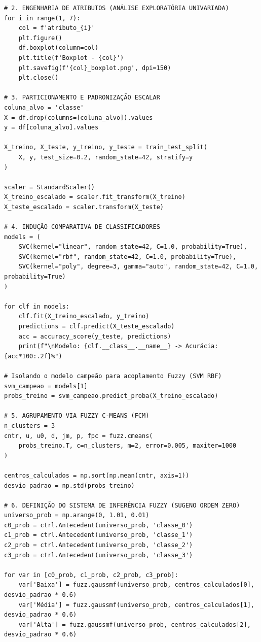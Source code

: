 \documentclass[journal]{IEEEtran}
\begin{document}
\begin{onecolumn}
\begin{verbatim}
# 2. ENGENHARIA DE ATRIBUTOS (ANÁLISE EXPLORATÓRIA UNIVARIADA)
for i in range(1, 7):
    col = f'atributo_{i}'
    plt.figure()
    df.boxplot(column=col)
    plt.title(f'Boxplot - {col}')
    plt.savefig(f'{col}_boxplot.png', dpi=150)
    plt.close()

# 3. PARTICIONAMENTO E PADRONIZAÇÃO ESCALAR
coluna_alvo = 'classe'
X = df.drop(columns=[coluna_alvo]).values
y = df[coluna_alvo].values

X_treino, X_teste, y_treino, y_teste = train_test_split(
    X, y, test_size=0.2, random_state=42, stratify=y
)

scaler = StandardScaler()
X_treino_escalado = scaler.fit_transform(X_treino)
X_teste_escalado = scaler.transform(X_teste)

# 4. INDUÇÃO COMPARATIVA DE CLASSIFICADORES
models = (
    SVC(kernel="linear", random_state=42, C=1.0, probability=True), 
    SVC(kernel="rbf", random_state=42, C=1.0, probability=True), 
    SVC(kernel="poly", degree=3, gamma="auto", random_state=42, C=1.0, probability=True)
)

for clf in models:
    clf.fit(X_treino_escalado, y_treino)
    predictions = clf.predict(X_teste_escalado)
    acc = accuracy_score(y_teste, predictions)
    print(f"\nModelo: {clf.__class__.__name__} -> Acurácia: {acc*100:.2f}%")

# Isolando o modelo campeão para acoplamento Fuzzy (SVM RBF)
svm_campeao = models[1]
probs_treino = svm_campeao.predict_proba(X_treino_escalado)

# 5. AGRUPAMENTO VIA FUZZY C-MEANS (FCM)
n_clusters = 3
cntr, u, u0, d, jm, p, fpc = fuzz.cmeans(
    probs_treino.T, c=n_clusters, m=2, error=0.005, maxiter=1000
)

centros_calculados = np.sort(np.mean(cntr, axis=1))
desvio_padrao = np.std(probs_treino)

# 6. DEFINIÇÃO DO SISTEMA DE INFERÊNCIA FUZZY (SUGENO ORDEM ZERO)
universo_prob = np.arange(0, 1.01, 0.01)
c0_prob = ctrl.Antecedent(universo_prob, 'classe_0')
c1_prob = ctrl.Antecedent(universo_prob, 'classe_1')
c2_prob = ctrl.Antecedent(universo_prob, 'classe_2')
c3_prob = ctrl.Antecedent(universo_prob, 'classe_3')

for var in [c0_prob, c1_prob, c2_prob, c3_prob]:
    var['Baixa'] = fuzz.gaussmf(universo_prob, centros_calculados[0], desvio_padrao * 0.6)
    var['Média'] = fuzz.gaussmf(universo_prob, centros_calculados[1], desvio_padrao * 0.6)
    var['Alta'] = fuzz.gaussmf(universo_prob, centros_calculados[2], desvio_padrao * 0.6)


\end{verbatim}
\end{onecolumn}
\end{document}
